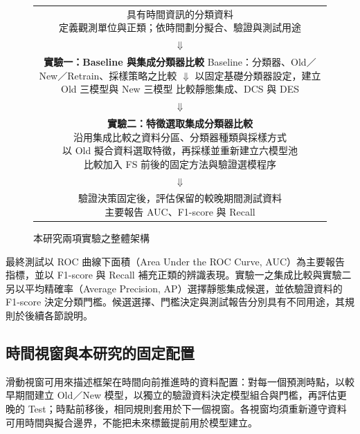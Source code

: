 \begin{figure}[htbp]
\centering
\begingroup
\small
{}
\setlength{\fboxsep}{8pt}
\begin{tabular}{@{}c@{}}
\fbox{\parbox{0.88\linewidth}{\centering 具有時間資訊的分類資料\\
定義觀測單位與正類；依時間劃分擬合、驗證與測試用途}}\\[3pt]
\(\Downarrow\)\\[3pt]
\fbox{\parbox{0.88\linewidth}{\centering\textbf{實驗一：Baseline 與集成分類器比較}\\[4pt]
Baseline：分類器、Old／New／Retrain、採樣策略之比較\\
\(\Downarrow\)\\
以固定基礎分類器設定，建立 Old 三模型與 New 三模型\\
比較靜態集成、DCS 與 DES}}\\[3pt]
\(\Downarrow\)\\[3pt]
\fbox{\parbox{0.88\linewidth}{\centering\textbf{實驗二：特徵選取集成分類器比較}\\[4pt]
沿用集成比較之資料分區、分類器種類與採樣方式\\
以 Old 擬合資料選取特徵，再採樣並重新建立六模型池\\
比較加入 FS 前後的固定方法與驗證選模程序}}\\[3pt]
\(\Downarrow\)\\[3pt]
\fbox{\parbox{0.88\linewidth}{\centering 驗證決策固定後，評估保留的較晚期間測試資料\\
主要報告 AUC、F1-score 與 Recall}}
\end{tabular}
\endgroup
\caption{本研究兩項實驗之整體架構}\label{fig:method-overview}
\par{}
\end{figure}

最終測試以 ROC 曲線下面積（Area Under the ROC Curve, AUC）為主要報告指標，並以 F1-score 與 Recall 補充正類的辨識表現。實驗一之集成比較與實驗二另以平均精確率（Average Precision, AP）選擇靜態集成候選，並依驗證資料的 F1-score 決定分類門檻。候選選擇、門檻決定與測試報告分別具有不同用途，其規則於後續各節說明。

\subsection{時間視窗與本研究的固定配置}\label{sec:method-time-window}

滑動視窗可用來描述框架在時間向前推進時的資料配置：對每一個預測時點，以較早期間建立 Old／New 模型，以獨立的驗證資料決定模型組合與門檻，再評估更晚的 Test；時點前移後，相同規則套用於下一個視窗。各視窗均須重新遵守資料可用時間與擬合邊界，不能把未來標籤提前用於模型建立。

